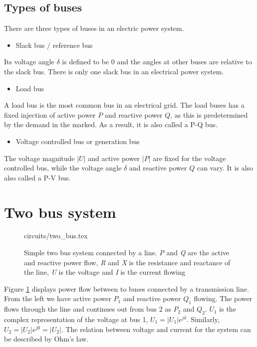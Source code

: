 \documentclass[class=book, crop=false]{standalone}
\begin{document}
\subsection{Types of buses}\label{theory:subsection:bus_types}

There are three types of buses in an electric power system\cite{opf_intro}.

\begin{itemize}
  \item Slack bus / reference bus
\end{itemize}
Its voltage angle $\delta$ is defined to be 0 and the angles at other buses are relative to the slack bus. There is only one slack bus in an electrical power system.

\begin{itemize}
  \item Load bus
\end{itemize}
A load bus is the most common bus in an electrical grid. The load buses has a fixed injection of active power $P$ and reactive power $Q$, as this is predetermined by the demand in the marked. As a result, it is also called a P-Q bus.

\begin{itemize}
  \item Voltage controlled bus or generation bus
\end{itemize}
The voltage magnitude $|U|$ and active power $|P|$ are fixed for the voltage controlled bus, while the voltage angle $\delta$ and reactive power $Q$ can vary. It is also also called a P-V bus. 


\section{Two bus system} 


\begin{figure}[ht!]
    \center
    {circuits/two_bus.tex}
    \caption[size = 9]
    {Simple two bus system connected by a line. \textit{P} and \textit{Q} are the active and reactive power flow, \textit{R} and \textit{X} is the resistance and reactance of the line, \textit{U} is the voltage and \textit{I} is the current flowing}    \label{fig:theory:two_bus}
\end{figure}

Figure \ref{fig:theory:two_bus} displays power flow between to buses connected by a transmission line. From the left we have active power $P_{1}$ and reactive power $Q_{1}$ flowing. The power flows through the line and continues out from bus 2 as $P_{2}$ and $Q_{2}$. $U_{1}$ is the complex representation of the voltage at bus 1, $U_{1} = |U_{1}|e^{j\delta}$. Similarly, $U_{2} = |U_{2}|e^{j0} = |U_{2}|$. The relation between voltage and current for the system can be described by Ohm's law.
\end{document}
